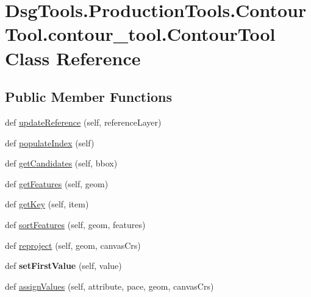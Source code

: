 \hypertarget{class_dsg_tools_1_1_production_tools_1_1_contour_tool_1_1contour__tool_1_1_contour_tool}{}\section{Dsg\+Tools.\+Production\+Tools.\+Contour\+Tool.\+contour\+\_\+tool.\+Contour\+Tool Class Reference}
\label{class_dsg_tools_1_1_production_tools_1_1_contour_tool_1_1contour__tool_1_1_contour_tool}
\subsection*{Public Member Functions}
\begin{DoxyCompactItemize}
\item 
def \mbox{\hyperlink{class_dsg_tools_1_1_production_tools_1_1_contour_tool_1_1contour__tool_1_1_contour_tool_a6a7b5ead3d76e267b30cfff2dec155c1}{update\+Reference}} (self, reference\+Layer)
\item 
def \mbox{\hyperlink{class_dsg_tools_1_1_production_tools_1_1_contour_tool_1_1contour__tool_1_1_contour_tool_ad0b252f6fd56abb4d75c522e7124bab7}{populate\+Index}} (self)
\item 
def \mbox{\hyperlink{class_dsg_tools_1_1_production_tools_1_1_contour_tool_1_1contour__tool_1_1_contour_tool_a4bb8cc0232fcfdc145aed0aae3d07630}{get\+Candidates}} (self, bbox)
\item 
def \mbox{\hyperlink{class_dsg_tools_1_1_production_tools_1_1_contour_tool_1_1contour__tool_1_1_contour_tool_ae3a9e1379fcfb2a84ffeba6d7c24853b}{get\+Features}} (self, geom)
\item 
def \mbox{\hyperlink{class_dsg_tools_1_1_production_tools_1_1_contour_tool_1_1contour__tool_1_1_contour_tool_aa6752b46896069093a97842ed50b0672}{get\+Key}} (self, item)
\item 
def \mbox{\hyperlink{class_dsg_tools_1_1_production_tools_1_1_contour_tool_1_1contour__tool_1_1_contour_tool_a01bdbd09cc15fe60b49d1f351e810c23}{sort\+Features}} (self, geom, features)
\item 
def \mbox{\hyperlink{class_dsg_tools_1_1_production_tools_1_1_contour_tool_1_1contour__tool_1_1_contour_tool_ad4eeaf446ce7ef596213c8731de8ea68}{reproject}} (self, geom, canvas\+Crs)
\item 
\mbox{\label{class_dsg_tools_1_1_production_tools_1_1_contour_tool_1_1contour__tool_1_1_contour_tool_a62f829495add08c6092bacc811aa012f}} 
def {\bfseries set\+First\+Value} (self, value)
\item 
def \mbox{\hyperlink{class_dsg_tools_1_1_production_tools_1_1_contour_tool_1_1contour__tool_1_1_contour_tool_a9e9ea2321b0a802c39e2ea4dcb0ba7de}{assign\+Values}} (self, attribute, pace, geom, canvas\+Crs)
\end{DoxyCompactItemize}

